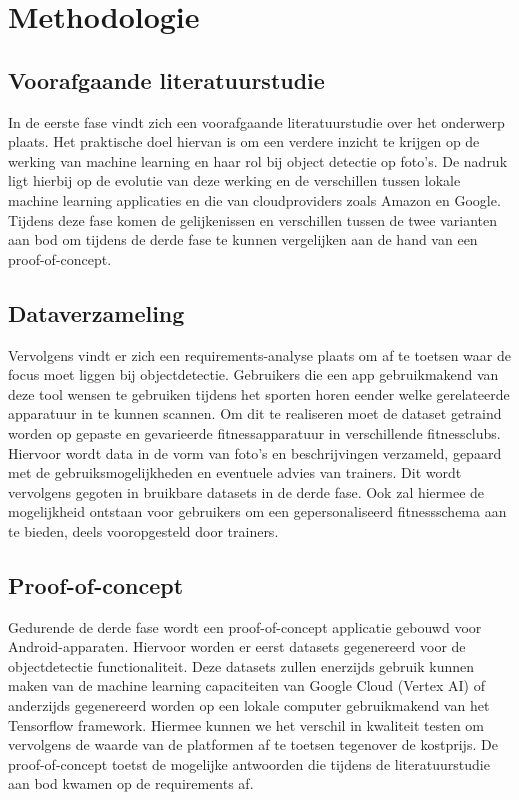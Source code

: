 \section{Methodologie}%
\label{sec:methodologie}
\subsection{Voorafgaande literatuurstudie}
\label{subsec:literature-study}
In de eerste fase vindt zich een voorafgaande literatuurstudie over het onderwerp plaats. %
Het praktische doel hiervan is om een verdere inzicht te krijgen op de werking van machine learning en haar rol bij object detectie op foto's.
De nadruk ligt hierbij op de evolutie van deze werking en de verschillen tussen lokale machine learning applicaties en die van cloudproviders zoals Amazon en Google.
Tijdens deze fase komen de gelijkenissen en verschillen tussen de twee varianten aan bod om tijdens de derde fase te kunnen vergelijken aan de hand van een proof-of-concept.

\subsection{Dataverzameling}
\label{subsec:dataverzameling}
Vervolgens vindt er zich een requirements-analyse plaats om af te toetsen waar de focus moet liggen bij objectdetectie. %
Gebruikers die een app gebruikmakend van deze tool wensen te gebruiken tijdens het sporten horen eender welke gerelateerde apparatuur in te kunnen scannen.
Om dit te realiseren moet de dataset getraind worden op gepaste en gevarieerde fitnessapparatuur in verschillende fitnessclubs.
Hiervoor wordt data in de vorm van foto's en beschrijvingen verzameld, gepaard met de gebruiksmogelijkheden en eventuele advies van trainers.
Dit wordt vervolgens gegoten in bruikbare datasets in de derde fase.
Ook zal hiermee de mogelijkheid ontstaan voor gebruikers om een gepersonaliseerd fitnessschema aan te bieden, deels vooropgesteld door trainers.

\subsection{Proof-of-concept}
\label{subsec:poc}
Gedurende de derde fase wordt een proof-of-concept applicatie gebouwd voor Android-apparaten. %
Hiervoor worden er eerst datasets gegenereerd voor de objectdetectie functionaliteit.
Deze datasets zullen enerzijds gebruik kunnen maken van de machine learning capaciteiten van Google Cloud (Vertex AI) of anderzijds gegenereerd worden op een lokale computer gebruikmakend van het Tensorflow framework.
Hiermee kunnen we het verschil in kwaliteit testen om vervolgens de waarde van de platformen af te toetsen tegenover de kostprijs.
De proof-of-concept toetst de mogelijke antwoorden die tijdens de literatuurstudie aan bod kwamen op de requirements af.

